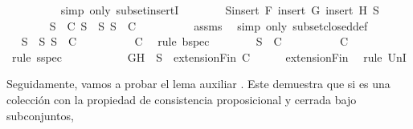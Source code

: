 \begin{isabellebody}
\ \ \ \ \ \ \ \ \isamarkupfalse%
\ {\isacharparenleft}simp\ only{\isacharcolon}\ subset{\isacharunderscore}insertI{}{\isacharparenright}\isanewline
\ \ \ \ \ \ \isamarkupfalse%
\ {\isacharquery}S{\isacharequal}{\isachardoublequoteopen}insert\ F\ {\isacharparenleft}insert\ G\ {\isacharparenleft}insert\ H\ S{\isacharprime}{\isacharparenright}{\isacharparenright}{\isachardoublequoteclose}\isanewline
\ \ \ \ \ \ \isamarkupfalse%
\ {\isachardoublequoteopen}{\isasymforall}S\ {\isasymin}\ C{\isachardot}\ {\isasymforall}S{\isacharprime}\ {\isasymsubseteq}\ S{\isachardot}\ S{\isacharprime}\ {\isasymin}\ C{\isachardoublequoteclose}\isanewline
\ \ \ \ \ \ \ \ \isamarkupfalse%
\ assms{\isacharparenleft}{}{\isacharparenright}\ \isamarkupfalse%
\ {\isacharparenleft}simp\ only{\isacharcolon}\ subset{\isacharunderscore}closed{\isacharunderscore}def{\isacharparenright}\isanewline
\ \ \ \ \ \ \isamarkupfalse%
\ \isamarkupfalse%
\ {\isachardoublequoteopen}{\isasymforall}S{\isacharprime}\ {\isasymsubseteq}\ {\isacharquery}S{\isachardot}\ S{\isacharprime}\ {\isasymin}\ C{\isachardoublequoteclose}\isanewline
\ \ \ \ \ \ \ \ \isamarkupfalse%
\ C{}\ \isamarkupfalse%
\ {\isacharparenleft}rule\ bspec{\isacharparenright}\isanewline
\ \ \ \ \ \ \isamarkupfalse%
\ {\isachardoublequoteopen}S{\isacharprime}\ {\isasymin}\ C{\isachardoublequoteclose}\isanewline
\ \ \ \ \ \ \ \ \isamarkupfalse%
\ C{}\ \isamarkupfalse%
\ {\isacharparenleft}rule\ sspec{\isacharparenright}\isanewline
\ \ \ \ \isamarkupfalse%
\isanewline
\ \ \isamarkupfalse%
\isanewline
\ \ \isamarkupfalse%
\ {\isachardoublequoteopen}{\isacharbraceleft}G{\isacharcomma}H{\isacharbraceright}\ {\isasymunion}\ S\ {\isasymin}\ {\isacharparenleft}extensionFin\ C{\isacharparenright}{\isachardoublequoteclose}\isanewline
\ \ \ \ \isamarkupfalse%
\ extensionFin\ \isamarkupfalse%
\ {\isacharparenleft}rule\ UnI{}{\isacharparenright}\isanewline
{}\isamarkupfalse%
%
\endisatagproof
{\isafoldproof}%
%
\isadelimproof
%
\endisadelimproof
%
\begin{isamarkuptext}%
Seguidamente, vamos a probar el lema auxiliar . Este demuestra que si  es 
  una colección con la propiedad de consistencia proposicional y cerrada bajo subconjuntos, 

\end{isamarkuptext}
\end{isabellebody}
